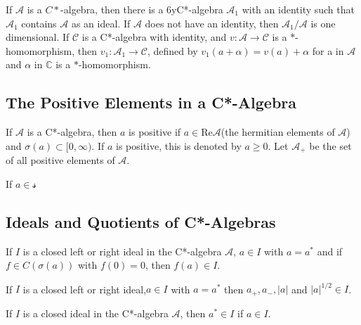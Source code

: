 \begin{proposition}
    If $\mathcal{A}$ is a $C*$-algebra, then there is a 6yC*-algebra $\mathcal{A}_1$ with an identity such that $\mathcal{A}_1$ contains $\mathcal{A}$ as an ideal. If $\mathcal{A}$ does not have an identity, then $\mathcal{A}_1/\mathcal{A}$ is one dimensional. If $\mathcal{C}$ is a C*-algebra with identity, and $v:\mathcal{A} \to \mathcal{C}$ is a $*$-homomorphism, then $v_1:\mathcal{A}_1 \to \mathcal{C}$, defined by $v_1(a+\alpha) = v(a) + \alpha$ for a in $\mathcal{A}$ and $\alpha$ in $\mathbb{C}$ is a $*$-homomorphism.
\end{proposition}

\subsection{The Positive Elements in a C*-Algebra}

\begin{definition}
    If $\mathcal{A}$ is a C*-algebra, then $a$ is positive if $a\in \text{Re} \mathcal{A}$(the hermitian elements of $\mathcal{A}$) and $\sigma(a) \subset [0,\infty)$. If $a$ is positive, this is denoted by $a\geq 0$. Let $\mathcal{A}_+$ be the set of all positive elements of $\mathcal{A}$.
\end{definition}

\begin{proposition}
    If $a\in\mathcal{s}$
\end{proposition}

\subsection{Ideals and Quotients of C*-Algebras}

\begin{proposition}
    If $I$ is a closed left or right ideal in the C*-algebra $\mathcal{A}$, $a\in I$ with $a = a^*$ and if $f\in C(\sigma(a))$ with $f(0) = 0$, then $f(a)\in I$.
\end{proposition}

\begin{corollary}
    If $I$ is a closed left or right ideal,$a\in I$ with $a = a^*$ then $a_+,a_-, |a|$ and $|a|^{1/2}\in I$.
\end{corollary}

\begin{theorem}
    If $I$ is a closed ideal in the C*-algebra $\mathcal{A}$, then $a^* \in I$ if $a\in I$.
\end{theorem}


